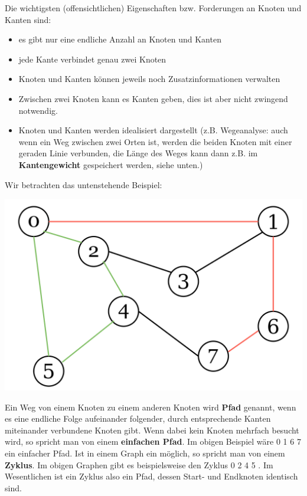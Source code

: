 \documentclass{article}
\begin{document}
Die wichtigsten (offensichtlichen) Eigenschaften bzw. Forderungen an Knoten und Kanten sind:
\begin{itemize}
    \item es gibt nur eine endliche Anzahl an Knoten und Kanten 
    \item jede Kante verbindet genau zwei Knoten 
    \item Knoten und Kanten können jeweils noch Zusatzinformationen verwalten
    \item Zwischen zwei Knoten kann es Kanten  geben, dies ist aber nicht zwingend notwendig. 
    \item Knoten und Kanten werden idealisiert dargestellt (z.B. Wegeanalyse: auch wenn ein Weg zwischen zwei Orten  ist, werden die beiden Knoten mit einer geraden Linie verbunden, die Länge des Weges kann dann z.B. im \textbf{Kantengewicht} gespeichert werden, siehe unten.)
\end{itemize}
Wir betrachten das untenstehende Beispiel:
\begin{center}
    \includegraphics[scale=0.25]{../media/example_graph.png}
\end{center}
Ein Weg von einem Knoten zu einem anderen Knoten wird \textbf{Pfad} genannt, wenn es eine endliche Folge aufeinander folgender, durch entsprechende Kanten miteinander verbundene Knoten gibt. Wenn dabei kein Knoten mehrfach besucht wird, so spricht man von einem \textbf{einfachen Pfad}. Im obigen Beispiel wäre \color{re} 0 1 6 7 \color{black} ein einfacher Pfad. 
Ist in einem Graph ein  möglich, so spricht man von einem \textbf{Zyklus}. Im obigen Graphen gibt es beispielsweise den Zyklus \color{gre} 0 2 4 5 \color{black}. Im Wesentlichen ist ein Zyklus also ein Pfad, dessen Start- und Endknoten identisch sind.
\end{document}

